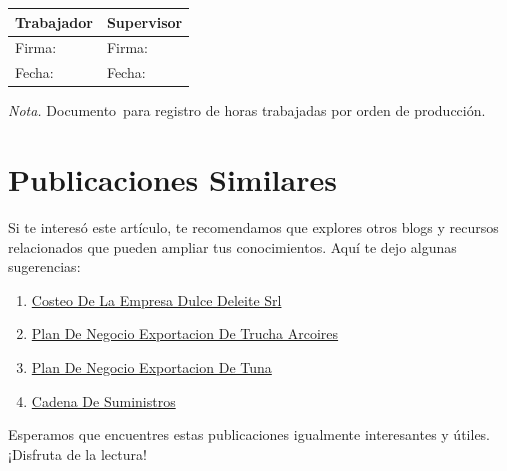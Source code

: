 \documentclass[
  stu,
  floatsintext,
  longtable,
  a4paper,
  nolmodern,
  notxfonts,
  notimes,
  12pt,
  colorlinks=true,linkcolor=blue,citecolor=blue,urlcolor=blue]{apa7}
\providecommand{\tightlist}{%
  \setlength{\itemsep}{0pt}\setlength{\parskip}{0pt}}
\newcounter{none} %
\begin{document}
\begin{table}

{\caption{{Tarjeta de Tiempo de Mano de Obra
Directa}{\label{tbl-tiempo}}}}

{\def\LTcaptype{none} %
\begin{longtable}[]{@{}ll@{}}
\toprule\noalign{}
Trabajador & Supervisor \\
\midrule\noalign{}
\endhead
\bottomrule\noalign{}
\endlastfoot
Firma: & Firma: \\
Fecha: & Fecha: \\
\end{longtable}
}

\noindent \emph{Nota.} Documento~para registro de horas trabajadas por
orden de producción.

\end{table}

\section{Publicaciones Similares}\label{apx-publicaciones-similares}

Si te interesó este artículo, te recomendamos que explores otros blogs y
recursos relacionados que pueden ampliar tus conocimientos. Aquí te dejo
algunas sugerencias:

\begin{enumerate}
\def\labelenumi{\arabic{enumi}.}
\tightlist
\item
  \href{https://actus-mercator.netlify.app/posts/2017-10-23-costeo-de-la-empresa-dulce-deleite-srl/index.pdf}{}
  \href{https://actus-mercator.netlify.app/posts/2017-10-23-costeo-de-la-empresa-dulce-deleite-srl}{Costeo
  De La Empresa Dulce Deleite Srl}
\item
  \href{https://actus-mercator.netlify.app/posts/2020-09-15-plan-de-negocio-exportacion-de-trucha-arcoires/index.pdf}{}
  \href{https://actus-mercator.netlify.app/posts/2020-09-15-plan-de-negocio-exportacion-de-trucha-arcoires}{Plan
  De Negocio Exportacion De Trucha Arcoires}
\item
  \href{https://actus-mercator.netlify.app/posts/2021-07-13-plan-de-negocio-exportacion-de-tuna/index.pdf}{}
  \href{https://actus-mercator.netlify.app/posts/2021-07-13-plan-de-negocio-exportacion-de-tuna}{Plan
  De Negocio Exportacion De Tuna}
\item
  \href{https://actus-mercator.netlify.app/posts/2022-01-23-cadena-de-suministros/index.pdf}{}
  \href{https://actus-mercator.netlify.app/posts/2022-01-23-cadena-de-suministros}{Cadena
  De Suministros}
\end{enumerate}

Esperamos que encuentres estas publicaciones igualmente interesantes y
útiles. ¡Disfruta de la lectura!
\end{document}
